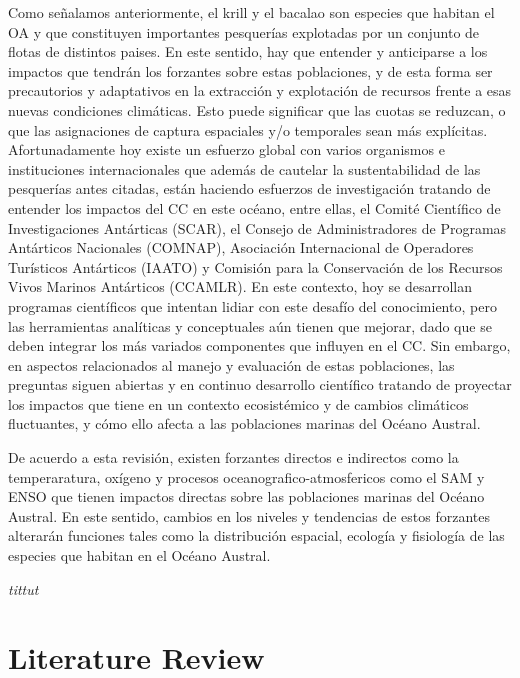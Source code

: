 \documentclass{umagthesis}
\begin{document}
Como señalamos anteriormente, el krill y el bacalao son especies que habitan el OA y que constituyen importantes pesquerías explotadas por un conjunto de flotas de distintos paises. En este sentido, hay que entender y anticiparse a los impactos que tendrán los forzantes sobre estas poblaciones, y de esta forma ser precautorios y adaptativos en la extracción y explotación de recursos frente a esas nuevas condiciones climáticas. Esto puede significar que las cuotas se reduzcan, o que las asignaciones de captura espaciales y/o temporales sean más explícitas. Afortunadamente hoy existe un esfuerzo global con varios organismos e instituciones internacionales que además de cautelar la sustentabilidad de las pesquerías antes citadas, están haciendo esfuerzos de investigación tratando de entender los impactos del CC en este océano, entre ellas, el Comité Científico de Investigaciones Antárticas (SCAR), el Consejo de Administradores de Programas Antárticos Nacionales (COMNAP), Asociación Internacional de Operadores Turísticos Antárticos (IAATO) y Comisión para la Conservación de los Recursos Vivos Marinos Antárticos (CCAMLR). En este contexto, hoy se desarrollan programas científicos que intentan lidiar con este desafío del conocimiento, pero las herramientas analíticas y conceptuales aún tienen que mejorar, dado que se deben integrar los más variados componentes que influyen en el CC. Sin embargo, en aspectos relacionados al manejo y evaluación de estas poblaciones, las preguntas siguen abiertas y en continuo desarrollo científico tratando de proyectar los impactos que tiene en un contexto ecosistémico y de cambios climáticos fluctuantes, y cómo ello afecta a las poblaciones marinas del Océano Austral.

De acuerdo a esta revisión, existen forzantes directos e indirectos como la temperaratura, oxígeno y procesos oceanografico-atmosfericos como el SAM y ENSO que tienen impactos directas sobre las poblaciones marinas del Océano Austral. En este sentido, cambios en los niveles y tendencias de estos forzantes alterarán funciones tales como la distribución espacial, ecología y fisiología de las especies que habitan en el Océano Austral.

\newpage

\emph{tittut}

\hypertarget{ch:litreview}{%
\chapter{Literature Review}\label{ch:litreview}}
\end{document}
